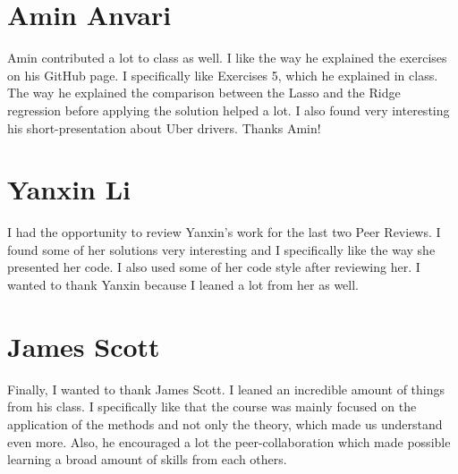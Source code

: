 \documentclass[11 pt]{article}
\begin{document}
\section{Amin Anvari}
Amin contributed a lot to class as well. I like the way he explained the exercises on his GitHub page. I specifically like Exercises 5, which he explained in class. The way he explained the comparison between the Lasso and the Ridge regression before applying the solution helped a lot. I also found very interesting his short-presentation about Uber drivers. Thanks Amin!

\section{Yanxin Li}
I had the opportunity to review Yanxin's work for the last two Peer Reviews. I found some of her solutions very interesting and I specifically like the way she presented her code. I also used some of her code style after reviewing her. I wanted to thank Yanxin because I leaned a lot from her as well.

\section{James Scott}
Finally, I wanted to thank James Scott. I leaned an incredible amount of things from his class. I specifically like that the course was mainly focused on the application of the methods and not only the theory, which made us understand even more. Also, he encouraged a lot the peer-collaboration which made possible learning a broad amount of skills from each others.
\end{document}
